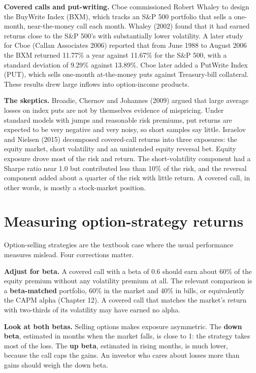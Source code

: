 \textbf{Covered calls and put-writing.} Cboe commissioned Robert Whaley to design the BuyWrite Index (BXM), which tracks an S\&P 500 portfolio that sells a one-month, near-the-money call each month. Whaley (2002) found that it had earned returns close to the S\&P 500's with substantially lower volatility. A later study for Cboe (Callan Associates 2006) reported that from June 1988 to August 2006 the BXM returned 11.77\% a year against 11.67\% for the S\&P 500, with a standard deviation of 9.29\% against 13.89\%. Cboe later added a PutWrite Index (PUT), which sells one-month at-the-money puts against Treasury-bill collateral. These results drew large inflows into option-income products.

\textbf{The skeptics.} Broadie, Chernov and Johannes (2009) argued that large average losses on index puts are not by themselves evidence of mispricing. Under standard models with jumps and reasonable risk premiums, put returns are expected to be very negative and very noisy, so short samples say little. Israelov and Nielsen (2015) decomposed covered-call returns into three exposures: the equity market, short volatility and an unintended equity reversal bet. Equity exposure drove most of the risk and return. The short-volatility component had a Sharpe ratio near 1.0 but contributed less than 10\% of the risk, and the reversal component added about a quarter of the risk with little return. A covered call, in other words, is mostly a stock-market position.

\section{Measuring option-strategy returns}
\label{sec:14-measure}

Option-selling strategies are the textbook case where the usual performance measures mislead. Four corrections matter.

\textbf{Adjust for beta.} A covered call with a beta of 0.6 should earn about 60\% of the equity premium without any volatility premium at all. The relevant comparison is a \textbf{beta-matched} portfolio, 60\% in the market and 40\% in bills, or equivalently the CAPM alpha (Chapter 12). A covered call that matches the market's return with two-thirds of its volatility may have earned no alpha.

\textbf{Look at both betas.} Selling options makes exposure asymmetric. The \textbf{down beta}, estimated in months when the market falls, is close to 1: the strategy takes most of the loss. The \textbf{up beta}, estimated in rising months, is much lower, because the call caps the gains. An investor who cares about losses more than gains should weigh the down beta.

